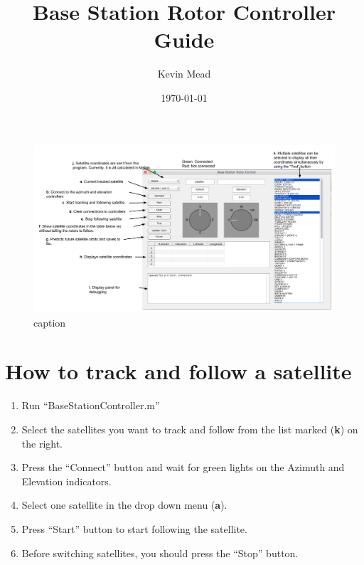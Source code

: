\documentclass[14pt,a4paper]{article}
\begin{document}
 
\title{Base Station Rotor Controller Guide} 
\author{Kevin Mead}

\date{\today} 
\maketitle 

\begin{figure}[htbp]
	\centering
		\includegraphics[width=\textwidth]{pictureGuide.pdf}
	\caption{caption}
	\label{fig:pictureGuide}
\end{figure}


\section*{How to track and follow a satellite} %
\label{sec:how_to_track_and_follow_a_satellite}

\begin{enumerate}
	\item Run ``BaseStationController.m''
	\item Select the satellites you want to track and follow from the list marked (\textbf{k}) on the right.
	\item Press the ``Connect'' button and wait for green lights on the Azimuth and Elevation indicators.
	\item Select one satellite in the drop down menu (\textbf{a}).
	\item Press ``Start'' button to start following the satellite.
	\item Before switching satellites, you should press the ``Stop'' button.
\end{enumerate}



\end{document}
